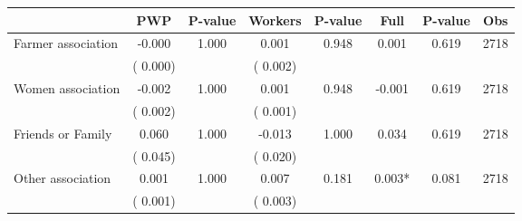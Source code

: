 
\begin{tabular}{l*{7}{c}}\hline&\multicolumn{1}{c}{PWP}&\multicolumn{1}{c}{P-value}&\multicolumn{1}{c}{Workers}&\multicolumn{1}{c}{P-value}&\multicolumn{1}{c}{Full}&\multicolumn{1}{c}{P-value}&\multicolumn{1}{c}{Obs} \\ \hline

 Farmer association       &             -0.000       &        1.000  &              0.001       &        0.948  &              0.001       &              0.619 &  2718 \\ 
                       &       (       0.000)             &                               &       (       0.002)                     &                               &                                               &                                &                      \\ 

 Women association       &             -0.002       &        1.000  &              0.001       &        0.948  &             -0.001       &              0.619 &  2718 \\ 
                       &       (       0.002)             &                               &       (       0.001)                     &                               &                                               &                                &                      \\ 

 Friends or Family       &              0.060       &        1.000  &             -0.013       &        1.000  &              0.034       &              0.619 &  2718 \\ 
                       &       (       0.045)             &                               &       (       0.020)                     &                               &                                               &                                &                      \\ 

 Other association       &              0.001       &        1.000  &              0.007       &        0.181  &              0.003*       &              0.081 &  2718 \\ 
                       &       (       0.001)             &                               &       (       0.003)                     &                               &                                               &                                &                      \\ 


\end{tabular}
